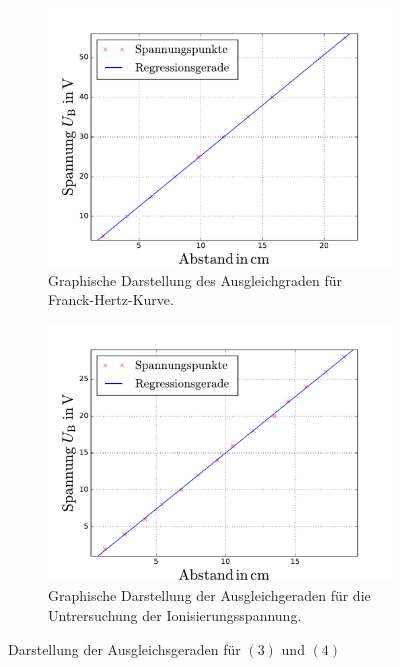 \begin{figure}
  \centering
  \begin{subfigure}{0.48\textwidth}
    \centering
    \includegraphics[width=1 \textwidth]{../Messdaten/frank_hertz_kuvre.pdf}
    \caption{Graphische Darstellung des Ausgleichgraden für Franck-Hertz-Kurve.}
    \label{fig: frank_hertz}
  \end{subfigure}
  \begin{subfigure}{0.48\textwidth}
    \centering
    \includegraphics[width=1 \textwidth]{../Messdaten/ioni.pdf}
    \caption{Graphische Darstellung der Ausgleichgeraden für die Untrersuchung der Ionisierungsspannung.} %
    \label{fig: enrgie_hot}
  \end{subfigure}
  \caption{Darstellung der Ausgleichsgeraden für $(3)$ und $(4)$}
  \label{fig: darstellung_2}
\end{figure}

